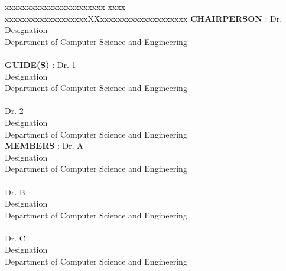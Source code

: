 \committee
\label{cmte}

\begin{tabbing}
	xxxxxxxxxxxxxxxxxxxxxxx \= xxxx \= xxxxxxxxxxxxxxxxxxxXXxxxxxxxxxxxxxxxxxxxx \kill
	\textbf{CHAIRPERSON}   \>:\> Dr. 
	\\ \> \> Designation 
	\\ \> \> Department of Computer Science and Engineering \\
	\\ %
	\textbf{GUIDE(S)}   \>:\> Dr. 1
	\\ \> \> Designation 
	\\ \> \> Department of Computer Science and Engineering \\
	\\ \> \> Dr. 2
	\\ \> \> Designation 
	\\ \> \> Department of Computer Science and Engineering \\
	\textbf{MEMBERS}	\>:\> Dr. A
	\\ \> \> Designation 
	\\ \> \> Department of Computer Science and Engineering \\
	\\ \> \> Dr. B
	\\ \> \> Designation 
	\\ \> \> Department of Computer Science and Engineering \\
	\\ \> \> Dr. C
	\\ \> \> Designation 
	\\ \> \> Department of Computer Science and Engineering \\
	\\
	
\end{tabbing}
